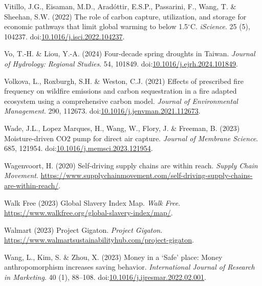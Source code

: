 \documentclass[
  letterpaper,
  DIV=11,
  numbers=noendperiod]{scrartcl}
\newlength{\cslhangindent}
\newenvironment{CSLReferences}[2] %
 {\begin{list}{}{%
  \setlength{\itemindent}{0pt}
  \setlength{\leftmargin}{0pt}
  \setlength{\parsep}{0pt}
  \ifodd #1
   \setlength{\leftmargin}{\cslhangindent}
   \setlength{\itemindent}{-1\cslhangindent}
  \fi
  \setlength{\itemsep}{#2\baselineskip}}}
 {\end{list}}
\begin{document}
\begin{CSLReferences}{0}{1}
Vitillo, J.G., Eisaman, M.D., Aradóttir, E.S.P., Passarini, F., Wang, T.
\& Sheehan, S.W. (2022) The role of carbon capture, utilization, and
storage for economic pathways that limit global warming to below
1.5{\(^\circ\)}{C}. \emph{iScience}. 25 (5), 104237.
doi:\href{https://doi.org/10.1016/j.isci.2022.104237}{10.1016/j.isci.2022.104237}.

Vo, T.-H. \& Liou, Y.-A. (2024) Four-decade spring droughts in {Taiwan}.
\emph{Journal of Hydrology: Regional Studies}. 54, 101849.
doi:\href{https://doi.org/10.1016/j.ejrh.2024.101849}{10.1016/j.ejrh.2024.101849}.

Volkova, L., Roxburgh, S.H. \& Weston, C.J. (2021) Effects of prescribed
fire frequency on wildfire emissions and carbon sequestration in a fire
adapted ecosystem using a comprehensive carbon model. \emph{Journal of
Environmental Management}. 290, 112673.
doi:\href{https://doi.org/10.1016/j.jenvman.2021.112673}{10.1016/j.jenvman.2021.112673}.

Wade, J.L., Lopez Marques, H., Wang, W., Flory, J. \& Freeman, B. (2023)
Moisture-driven {CO2} pump for direct air capture. \emph{Journal of
Membrane Science}. 685, 121954.
doi:\href{https://doi.org/10.1016/j.memsci.2023.121954}{10.1016/j.memsci.2023.121954}.

Wagenvoort, H. (2020) Self-driving supply chains are within reach.
\emph{Supply Chain Movement}.
\url{https://www.supplychainmovement.com/self-driving-supply-chains-are-within-reach/}.

Walk Free (2023) Global {Slavery Index Map}. \emph{Walk Free}.
\url{https://www.walkfree.org/global-slavery-index/map/}.

Walmart (2023) {Project Gigaton}. \emph{Project Gigaton}.
\url{https://www.walmartsustainabilityhub.com/project-gigaton}.

Wang, L., Kim, S. \& Zhou, X. (2023) Money in a {`{Safe}'} place:
{Money} anthropomorphism increases saving behavior. \emph{International
Journal of Research in Marketing}. 40 (1), 88--108.
doi:\href{https://doi.org/10.1016/j.ijresmar.2022.02.001}{10.1016/j.ijresmar.2022.02.001}.


\end{CSLReferences}
\end{document}
